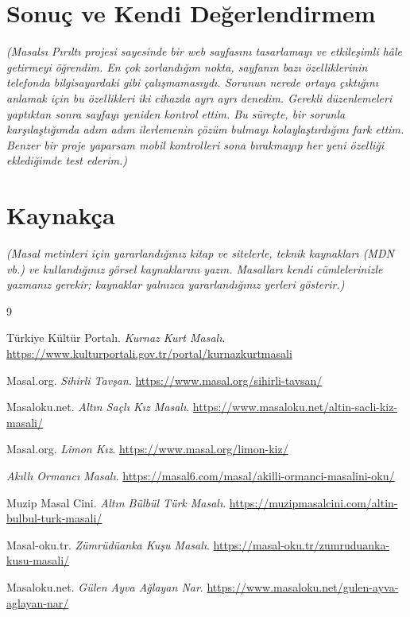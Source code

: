 \documentclass[12pt,a4paper]{article}
\newcommand{\aciklama}[1]{{\color{gray}\itshape (#1)}}
\begin{document}
\section{Sonuç ve Kendi Değerlendirmem}
\aciklama{Masalsı Pırıltı projesi sayesinde bir web sayfasını tasarlamayı ve etkileşimli hâle getirmeyi öğrendim. En çok zorlandığım nokta, sayfanın bazı özelliklerinin telefonda bilgisayardaki gibi çalışmamasıydı. Sorunun nerede ortaya çıktığını anlamak için bu özellikleri iki cihazda ayrı ayrı denedim. Gerekli düzenlemeleri yaptıktan sonra sayfayı yeniden kontrol ettim. Bu süreçte, bir sorunla karşılaştığımda adım adım ilerlemenin çözüm bulmayı kolaylaştırdığını fark ettim. Benzer bir proje yaparsam mobil kontrolleri sona bırakmayıp her yeni özelliği eklediğimde test ederim.}

\section{Kaynakça}
\aciklama{Masal metinleri için yararlandığınız kitap ve sitelerle, teknik kaynakları
(MDN vb.) ve kullandığınız görsel kaynaklarını yazın. Masalları kendi
cümlelerinizle yazmanız gerekir; kaynaklar yalnızca yararlandığınız yerleri
gösterir.}

\begin{thebibliography}{9}
\raggedright

Türkiye Kültür Portalı.
\emph{Kurnaz Kurt Masalı}.
\url{https://www.kulturportali.gov.tr/portal/kurnazkurtmasali}

Masal.org.
\emph{Sihirli Tavşan}.
\url{https://www.masal.org/sihirli-tavsan/}

Masaloku.net.
\emph{Altın Saçlı Kız Masalı}.
\url{https://www.masaloku.net/altin-sacli-kiz-masali/}

Masal.org.
\emph{Limon Kız}.
\url{https://www.masal.org/limon-kiz/}


\emph{Akıllı Ormancı Masalı}.
\url{https://masal6.com/masal/akilli-ormanci-masalini-oku/}

Muzip Masal Cini.
\emph{Altın Bülbül Türk Masalı}.
\url{https://muzipmasalcini.com/altin-bulbul-turk-masali/}

Masal-oku.tr.
\emph{Zümrüdüanka Kuşu Masalı}.
\url{https://masal-oku.tr/zumruduanka-kusu-masali/}

Masaloku.net.
\emph{Gülen Ayva Ağlayan Nar}.
\url{https://www.masaloku.net/gulen-ayva-aglayan-nar/}

\end{thebibliography}
\end{document}
